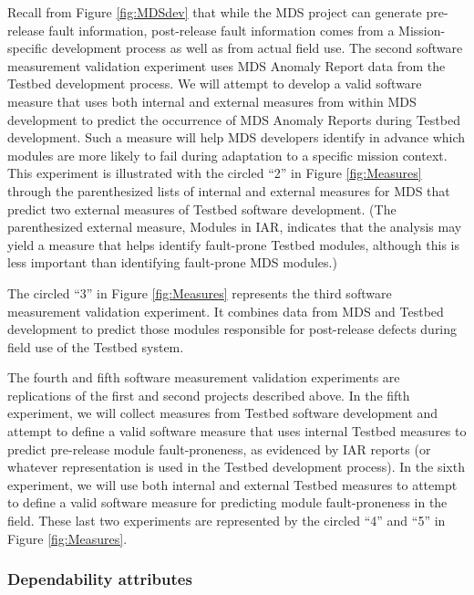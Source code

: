 Recall from Figure \ref{fig:MDSdev} that while the MDS project can generate
pre-release fault information, post-release fault information comes from a
Mission-specific development process as well as from actual field use.  The
second software measurement validation experiment uses MDS Anomaly Report
data from the Testbed development process. We will attempt to develop a
valid software measure that uses both internal and external measures
from within MDS development to predict the occurrence of MDS Anomaly Reports during
Testbed development.  Such a measure will help MDS developers identify in
advance which modules are more likely to fail during adaptation to a
specific mission context.  This experiment is illustrated with the circled ``2''
in Figure \ref{fig:Measures} through the parenthesized lists of internal and
external measures for MDS that predict two external measures of Testbed
software development. (The parenthesized external measure, Modules in IAR,
indicates that the analysis may yield a measure that helps identify
fault-prone Testbed modules, although this is less important than
identifying fault-prone MDS modules.)

The circled ``3'' in Figure \ref{fig:Measures} represents the third
software measurement validation experiment. It combines data from MDS
and Testbed development to predict those modules responsible for
post-release defects during field use of the Testbed system. 

The fourth and fifth software measurement validation experiments are
replications of the first and second projects described above. In the fifth
experiment, we will collect measures from Testbed software development and
attempt to define a valid software measure that uses internal Testbed
measures to predict pre-release module fault-proneness, as evidenced by IAR
reports (or whatever representation is used in the Testbed development
process).  In the sixth experiment, we will use both internal and external
Testbed measures to attempt to define a valid software measure for
predicting module fault-proneness in the field. These last two experiments
are represented by the circled ``4'' and ``5'' in Figure
\ref{fig:Measures}.

\subsubsection{Dependability attributes}

